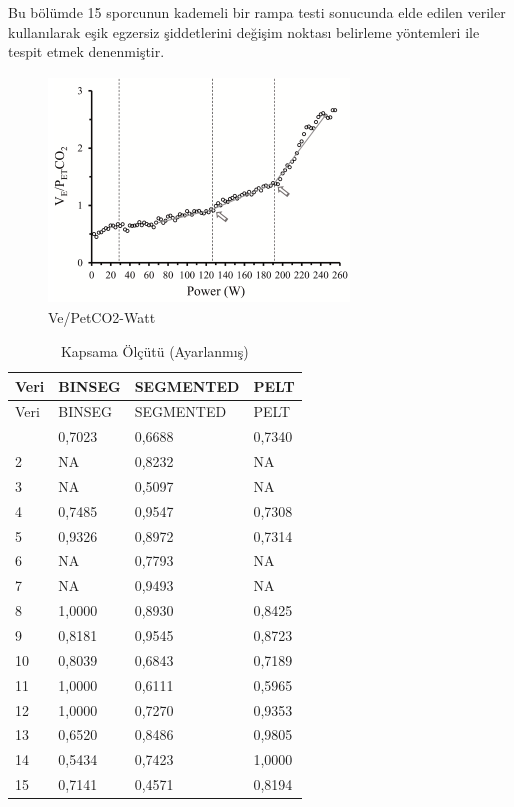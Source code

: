 \documentclass[12pt,twoside]{deuthesis}
\begin{document}
Bu bölümde 15 sporcunun kademeli bir rampa testi sonucunda elde edilen veriler kullanılarak eşik egzersiz şiddetlerini değişim noktası belirleme yöntemleri ile tespit etmek denenmiştir.

\begin{figure}
\includegraphics[width=302px,height=228px]{figure/vepetco2} \caption{Ve/PetCO2-Watt}\label{fig:unnamed-chunk-5}
\end{figure}

\begin{longtable}[]{@{}llll@{}}
\caption{\label{tab:nvar6} Kapsama Ölçütü (Ayarlanmış)}\tabularnewline
\toprule\noalign{}
Veri & BINSEG & SEGMENTED & PELT \\
\midrule\noalign{}
\endfirsthead
\toprule\noalign{}
Veri & BINSEG & SEGMENTED & PELT \\
\midrule\noalign{}
\endhead
\bottomrule\noalign{}
\endlastfoot
1 & 0,7023 & 0,6688 & 0,7340 \\
2 & NA & 0,8232 & NA \\
3 & NA & 0,5097 & NA \\
4 & 0,7485 & 0,9547 & 0,7308 \\
5 & 0,9326 & 0,8972 & 0,7314 \\
6 & NA & 0,7793 & NA \\
7 & NA & 0,9493 & NA \\
8 & 1,0000 & 0,8930 & 0,8425 \\
9 & 0,8181 & 0,9545 & 0,8723 \\
10 & 0,8039 & 0,6843 & 0,7189 \\
11 & 1,0000 & 0,6111 & 0,5965 \\
12 & 1,0000 & 0,7270 & 0,9353 \\
13 & 0,6520 & 0,8486 & 0,9805 \\
14 & 0,5434 & 0,7423 & 1,0000 \\
15 & 0,7141 & 0,4571 & 0,8194 \\
\end{longtable}
\end{document}
